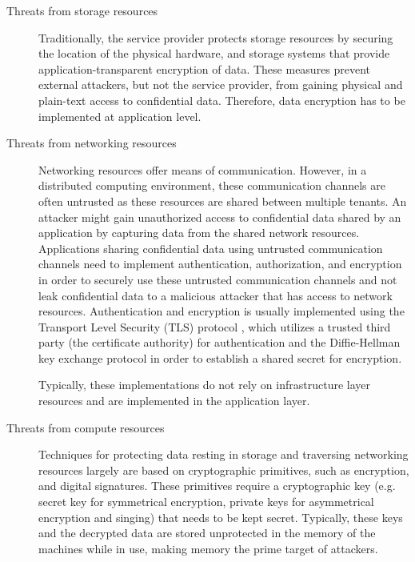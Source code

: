 \begin{description}
  \item[Threats from storage resources]
    Traditionally, the service provider protects storage resources by securing
    the location of the physical hardware, and storage systems that provide
    application-transparent encryption of data. These measures prevent external
    attackers, but not the service provider, from gaining physical and
    plain-text access to confidential data. Therefore, data encryption has to be
    implemented at application level.

  \item[Threats from networking resources]
    Networking resources offer means of communication. However, in a distributed
    computing environment, these communication channels are often untrusted as
    these resources are shared between multiple tenants. An attacker might gain
    unauthorized access to confidential data shared by an application by
    capturing data from the shared network resources. Applications sharing
    confidential data using untrusted communication channels need to implement
    authentication, authorization, and encryption in order to securely use these
    untrusted communication channels and not leak confidential data to a
    malicious attacker that has access to network resources. Authentication and
    encryption is usually implemented using the Transport Level Security (TLS)
    protocol \cite{rfc5246}, which utilizes a trusted third party (the
    certificate authority) for authentication and the Diffie-Hellman key
    exchange protocol in order to establish a shared secret for encryption.

    Typically, these implementations do not rely on infrastructure layer
    resources and are implemented in the application layer.

  \item[Threats from compute resources]
    Techniques for protecting data resting in storage and traversing networking
    resources largely are based on cryptographic primitives, such as encryption,
    and digital signatures. These primitives require a cryptographic key (e.g.
    secret key for symmetrical encryption, private keys for asymmetrical
    encryption and singing) that needs to be kept secret. Typically, these keys
    and the decrypted data are stored unprotected in the memory of the machines
    while in use, making memory the prime target of attackers.


\end{description}
